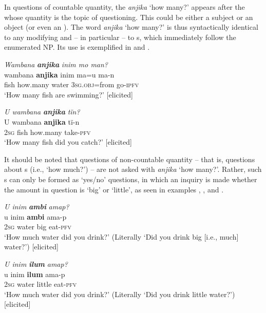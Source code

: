  In questions of countable quantity, the  \textit{anjika} ‘how many?’ appears after the  whose quantity is the topic of questioning. This could be either a subject or an object (or even an  ). The word \textit{anjika} ‘how many?’ is thus syntactically identical to any modifying  and -- in particular -- to s, which immediately follow the enumerated NP. Its use is exemplified in  and .

\ea%
    \label{ex:syntax:15}
          \textit{Wambana} \textbf{\textit{anjika}} \textit{inim mo man?}\\
\gll    wambana  \textbf{anjika}    inim  ma=u      ma-n\\
    fish    how.many  water  \textsc{3sg.obj}=from  go-\textsc{ipfv}\\
\glt `How many fish are swimming?’ [elicited]
\z

\ea%
    \label{ex:syntax:16}
          \textit{U wambana} \textbf{\textit{anjika}} \textit{tïn?}\\
\gll    U    wambana  \textbf{anjika}    tï-n\\
    \textsc{2sg}  fish    how.many  take-\textsc{pfv}\\
\glt `How many fish did you catch?’ [elicited]
\z


It should be noted that questions of non-countable quantity -- that is, questions about s (i.e., ‘how much?’) -- are not asked with \textit{anjika} ‘how many?’. Rather, such s can only be formed as ‘yes/no’ questions, in which an inquiry is made whether the amount in question is ‘big’ or ‘little’, as seen in examples , , and .

\ea%
    \label{ex:syntax:17}
          \textit{U inim} \textbf{\textit{ambi}} \textit{amap?}\\
\gll    u    inim  \textbf{ambi}  ama-p\\
    2\textsc{sg}  water  big    eat-\textsc{pfv}\\
\glt `How much water did you drink?’ (Literally ‘Did you drink big [i.e., much] water?’) [elicited]
\z

\ea%
    \label{ex:syntax:18}
          \textit{U inim} \textbf{\textit{ilum}} \textit{amap?}\\
\gll    u    inim  \textbf{ilum}  ama-p\\
    2\textsc{sg}  water  little  eat-\textsc{pfv}\\
\glt `How much water did you drink?’ (Literally ‘Did you drink little water?’) [elicited]
\z


